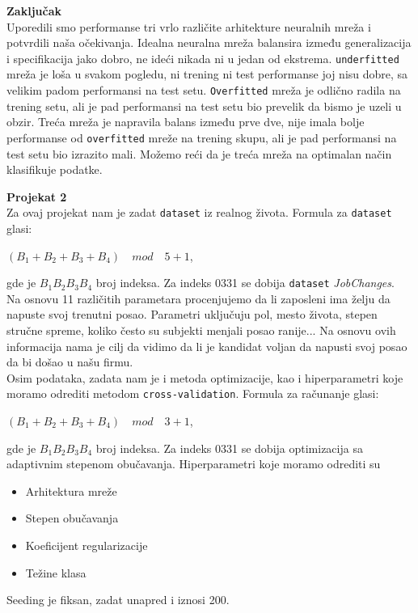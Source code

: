 \documentclass{article}
\providecommand{\inlinecode}[1]{\texttt{#1}}
\newenvironment{problem}[2][Projekat]
    { \begin{mdframed}[backgroundcolor=gray!20] \textbf{#1 #2} \\}
    {  \end{mdframed}}
\newenvironment{eComment}[2][Zaključak]
    { \begin{mdframed}[backgroundcolor=gray!40] \textbf{#1 #2} \\}
    {  \end{mdframed}}
\begin{document}
    
    \begin{eComment}{}
    Uporedili smo performanse tri vrlo različite arhitekture neuralnih mreža i potvrdili naša očekivanja. Idealna neuralna mreža balansira između generalizacija i specifikacija jako dobro, ne ideći nikada ni u jedan od ekstrema. \inlinecode{underfitted} mreža je loša u svakom pogledu, ni trening ni test performanse joj nisu dobre, sa velikim padom performansi na test setu. \inlinecode{Overfitted} mreža je odlično radila na trening setu, ali je pad performansi na test setu bio prevelik da bismo je uzeli u obzir. Treća mreža je napravila balans između prve dve, nije imala bolje performanse od \inlinecode{overfitted} mreže na trening skupu, ali je pad performansi na test setu bio izrazito mali. Možemo reći da je treća mreža na optimalan način klasifikuje podatke.
    \end{eComment}
    \newpage
    \begin{problem}{2}
    Za ovaj projekat nam je zadat \inlinecode{dataset} iz realnog života. 
    Formula za \inlinecode{dataset} glasi:
    \begin{center}
        $(B_1 + B_2 + B_3 + B_4)  \quad mod \quad 5 + 1$,
    \end{center} gde je $B_1B_2B_3B_4$ broj indeksa. Za indeks 0331 se dobija \inlinecode{dataset} \textit{JobChanges}.\\
    Na osnovu 11 različitih parametara procenjujemo da li zaposleni ima želju da napuste svoj trenutni posao. Parametri uključuju pol, mesto života, stepen stručne spreme, koliko često su subjekti menjali posao ranije... Na osnovu ovih informacija nama je cilj da vidimo da li je kandidat voljan da napusti svoj posao da bi došao u našu firmu.\\
    Osim podataka, zadata nam je i metoda optimizacije, kao i hiperparametri koje moramo odrediti metodom \inlinecode{cross-validation}. Formula za računanje glasi:
    \begin{center}
        $(B_1 + B_2 + B_3 + B_4)  \quad mod \quad 3 + 1$,
    \end{center} gde je $B_1B_2B_3B_4$ broj indeksa. Za indeks 0331 se dobija optimizacija sa adaptivnim stepenom obučavanja. Hiperparametri koje moramo odrediti su 
    \begin{itemize}
        \item Arhitektura mreže
        \item Stepen obučavanja
        \item Koeficijent regularizacije
        \item Težine klasa
    \end{itemize}
        Seeding je fiksan, zadat unapred i iznosi 200. 

        \end{problem}
\end{document}
